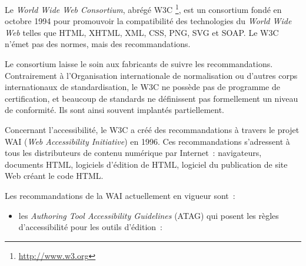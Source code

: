\documentclass[
]{book}
\providecommand{\tightlist}{%
  \setlength{\itemsep}{0pt}\setlength{\parskip}{0pt}}
\begin{document}
Le \emph{World Wide Web Consortium}, abrégé W3C \footnote{\url{http://www.w3.org}}, est un
consortium fondé en octobre 1994 pour promouvoir la compatibilité des
technologies du \emph{World Wide Web} telles que HTML, XHTML, XML, CSS,
PNG, SVG et SOAP. Le W3C n'émet pas des normes, mais des recommandations.

Le consortium laisse le soin aux fabricants de suivre les recommandations.
Contrairement à l'Organisation internationale de normalisation ou d'autres
corps internationaux de standardisation, le W3C ne possède pas de programme
de certification, et beaucoup de standards ne définissent pas formellement un
niveau de conformité. Ils sont ainsi souvent implantés partiellement.

Concernant l'accessibilité, le W3C a créé des recommandations à travers le
projet WAI (\emph{Web Accessibility Initiative}) en 1996. Ces
recommandations s'adressent à tous les distributeurs de contenu numérique par
Internet~: navigateurs, documents HTML, logiciels d'édition de HTML, logiciel
du publication de site Web créant le code HTML.

Les recommandations de la WAI actuellement en vigueur sont~:

\begin{itemize}
\tightlist
\item
  les \emph{Authoring Tool Accessibility Guidelines}
  (ATAG) qui posent les règles d'accessibilité pour les outils d'édition~:
\end{itemize}
\end{document}
